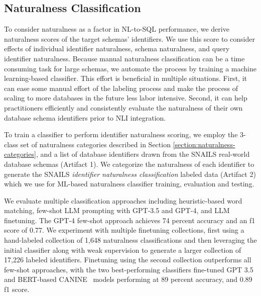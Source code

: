 \subsection{Naturalness Classification}
\label{subsection:naturalness-scoring}

To consider naturalness as a factor in NL-to-SQL performance, we derive naturalness scores of the target schemas' identifiers.
We use this score to consider effects of individual identifier naturalness, schema naturalness, and query identifier naturalness.
Because manual naturalness classification can be a time consuming task for large schemas, we automate the process by training a machine learning-based classifier.
This effort is beneficial in multiple situations.
First, it can ease some manual effort of the labeling process and make the process of scaling to more databases in the future less labor intensive.
Second, it can help practitioners efficiently and consistently evaluate the naturalness of their own database schema identifiers prior to NLI integration.


To train a classifier to perform identifier naturalness scoring, we employ the 3-class set of naturalness categories described in Section \ref{section:naturalness-categories}, and a list of database identifiers drawn from the SNAILS real-world database schemas (Artifact 1).
We categorize the naturalness of each identifier to generate the SNAILS \emph{identifier naturalness classification} labeled data (Artifact 2) which we use for ML-based naturalness classifier training, evaluation and testing.

We evaluate multiple classification approaches including heuristic-based word matching, few-shot LLM prompting with GPT-3.5 and GPT-4, and LLM finetuning.
The GPT-4 few-shot approach achieves 74 percent accuracy and an f1 score of 0.77.
We experiment with multiple finetuning collections, first using a hand-labeled collection of 1,648 naturalness classifications and then leveraging the initial classifier along with weak supervision to generate a larger collection of 17,226 labeled identifiers.
Finetuning using the second collection outperforms all few-shot approaches, with the
two best-performing classifiers fine-tuned GPT 3.5 and BERT-based CANINE~\cite{Clark-2022} models performing at 89 percent accuracy, and 0.89 f1 score.

